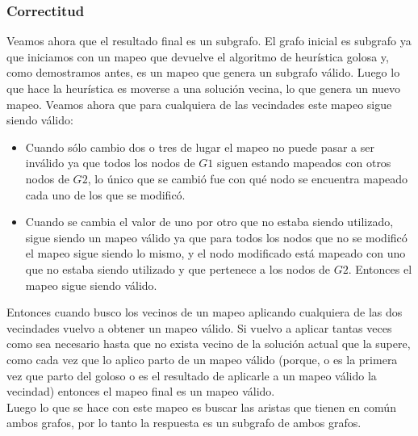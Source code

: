\subsubsection*{Correctitud}
\noindent Veamos ahora que el resultado final es un subgrafo. El grafo inicial es subgrafo ya que iniciamos con un mapeo que devuelve el algoritmo de heurística golosa y, como demostramos antes, es un mapeo que genera un subgrafo válido. Luego lo que hace la heurística es moverse a una solución vecina, lo que genera un nuevo mapeo. Veamos ahora que para cualquiera de las vecindades este mapeo sigue siendo válido: 
\begin{itemize}
	\item Cuando sólo cambio dos o tres de lugar el mapeo no puede pasar a ser inválido ya que todos los nodos de $G1$ siguen estando mapeados con otros nodos de $G2$, lo único que se cambió fue con qué nodo se encuentra mapeado cada uno de los que se modificó.
    \item Cuando se cambia el valor de uno por otro que no estaba siendo utilizado, sigue siendo un mapeo válido ya que para todos los nodos que no se modificó el mapeo sigue siendo lo mismo, y el nodo modificado está mapeado con uno que no estaba siendo utilizado y que pertenece a los nodos de $G2$. Entonces el mapeo sigue siendo válido. 
\end{itemize}
Entonces cuando busco los vecinos de un mapeo aplicando cualquiera de las dos vecindades vuelvo a obtener un mapeo válido. Si vuelvo a aplicar tantas veces como sea necesario hasta que no exista vecino de la solución actual que la supere, como cada vez que lo aplico parto de un mapeo válido (porque, o es la primera vez que parto del goloso o es el resultado de aplicarle a un mapeo válido la vecindad) entonces el mapeo final es un mapeo válido. \\
Luego lo que se hace con este mapeo es buscar las aristas que tienen en común ambos grafos, por lo tanto la respuesta es un subgrafo de ambos grafos. 


